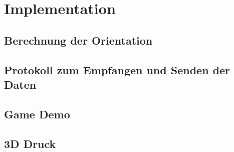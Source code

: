 \section{Implementation}

\subsection{Berechnung der Orientation}

\newpage

\subsection{Protokoll zum Empfangen und Senden der Daten}

\newpage

\subsection{Game Demo} 

\newpage

\subsection{3D Druck} 

\newpage
